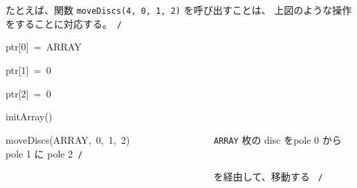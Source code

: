 \documentclass[a4paper,10pt]{article}
\def\mc{\relax}
\begin{document}
たとえば、関数 {\tt moveDiscs(4, 0, 1, 2)} を呼び出すことは、
上図のような操作をすることに対応する。\hfill \rm\mc \ {\tt *}{\tt /}
\tt\mc 

\noindent
\mbox{}\hfill

\noindent
\mbox{}ptr[0]{\tt\mc \ }={\tt\mc \ }ARRAY

\noindent
\mbox{}ptr[1]{\tt\mc \ }={\tt\mc \ }0

\noindent
\mbox{}ptr[2]{\tt\mc \ }={\tt\mc \ }0

\noindent
\mbox{}\hfill

\noindent
\mbox{}initArray()

\noindent
\mbox{}moveDiscs(ARRAY,{\tt\mc \ }0,{\tt\mc \ }1,{\tt\mc \ }2){\tt\mc \ }{\tt\mc \ }{\tt\mc \ }{\tt\mc \ }{\tt\mc \ }{\tt\mc \ }{\tt\mc \ }{\tt\mc \ }{\tt\mc \ }{\tt\mc \ }{\tt\mc \ }{\tt\mc \ }{\tt\mc \ }{\tt\mc \ }{\tt\mc \ }\rm\mc {\tt /}{\tt *}\  \ {\tt ARRAY} 枚の disc をpole 0 から pole 1 に pole 2\hfill \rm\mc \ {\tt *}{\tt /}
\tt\mc 

\noindent
\mbox{}{\tt\mc \ }{\tt\mc \ }{\tt\mc \ }{\tt\mc \ }{\tt\mc \ }{\tt\mc \ }{\tt\mc \ }{\tt\mc \ }{\tt\mc \ }{\tt\mc \ }{\tt\mc \ }{\tt\mc \ }{\tt\mc \ }{\tt\mc \ }{\tt\mc \ }{\tt\mc \ }{\tt\mc \ }{\tt\mc \ }{\tt\mc \ }{\tt\mc \ }{\tt\mc \ }{\tt\mc \ }{\tt\mc \ }{\tt\mc \ }{\tt\mc \ }{\tt\mc \ }{\tt\mc \ }{\tt\mc \ }{\tt\mc \ }{\tt\mc \ }{\tt\mc \ }{\tt\mc \ }{\tt\mc \ }{\tt\mc \ }{\tt\mc \ }{\tt\mc \ }{\tt\mc \ }{\tt\mc \ }{\tt\mc \ }{\tt\mc \ }\rm\mc {\tt /}{\tt *}\  \ を経由して、移動する \hfill \rm\mc \ {\tt *}{\tt /}

\tt\mc 

\rm\mc
\end{document}
